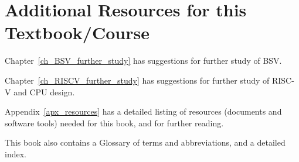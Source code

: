 
\section{Additional Resources for this Textbook/Course}

Chapter~\ref{ch_BSV_further_study} has suggestions for further study
of BSV.

Chapter~\ref{ch_RISCV_further_study} has suggestions for further study
of RISC-V and CPU design.

Appendix~\ref{apx_resources} has a detailed listing of resources
(documents and software tools) needed for this book, and for further
reading.

This book also contains a Glossary of terms and abbreviations, and a
detailed index.

